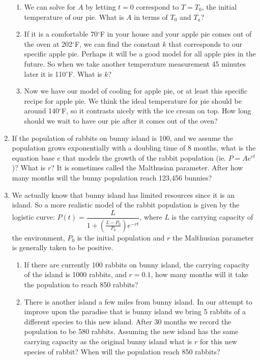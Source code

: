 \documentclass[12pt]{article}
\theoremstyle{plain}     %
\begin{document}
\begin{enumerate}
\begin{enumerate}
			\item We can solve for $A$ by letting $t=0$ correspond to $T=T_0$, the initial temperature of our pie. What is $A$ in terms of $T_0$ and $T_a$?\\
			\item If it is a comfortable 70$^\circ$F in your house and your apple pie comes out of the oven at 202$^\circ$F, we can find the constant $k$ that corresponds to our specific apple pie. Perhaps it will be a good model for all apple pies in the future. So when we take another temperature measurement 45 minutes later it is 110$^\circ$F. What is $k$?\\
			\item Now we have our model of cooling for apple pie, or at least this specific recipe for apple pie. We think the ideal temperature for pie should be around 140$^\circ$F, so it contrasts nicely with the ice cream on top. How long should we wait to have our pie after it comes out of the oven?\\[.5cm]
		\end{enumerate}
	\item If the population of rabbits on bunny island is 100, and we assume the population grows exponentially with a doubling time of 8 months, what is the equation base $e$ that models the growth of the rabbit population (ie. $P=Ae^{rt}$)? What is $r$? It is sometimes called the Malthusian parameter. After how many months will the bunny population reach 123,456 bunnies?\\[.5cm]
	\item We actually know that bunny island has limited resources since it is an island. So a more realistic model of the rabbit population is given by the logistic curve: $P(t)=\dfrac{L}{1+\left(\frac{L-P_0}{P_0}\right)e^{-rt}}$, where $L$ is the carrying capacity of the environment, $P_0$ is the initial population and $r$ the Malthusian parameter is generally taken to be positive. 
		\begin{enumerate}
			\item If there are currently 100 rabbits on bunny island, the carrying capacity of the island is 1000 rabbits, and $r=0.1$, how many months will it take the population to reach 850 rabbits?\\
			\item There is another island a few miles from bunny island. In our attempt to improve upon the paradise that is bunny island we bring 5 rabbits of a different species to this new island. After 30 months we record the population to be 580 rabbits.  Assuming the new island has the same carrying capacity as the original bunny island what is $r$ for this new species of rabbit? When will the population reach 850 rabbits?\\[.5cm]
		\end{enumerate}

\end{enumerate}
\end{document}
